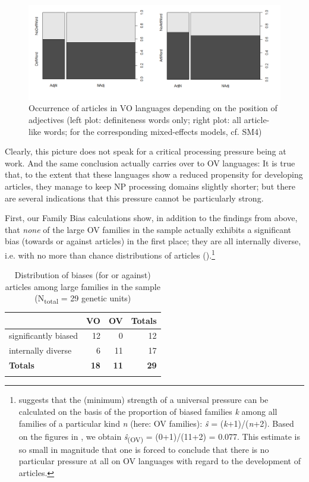 \documentclass[output=paper]{langsci/langscibook}
\begin{document}
  

\begin{figure}
\includegraphics[width=\textwidth]{figures/schmidtkebode-img4.png}
\caption{Occurrence of articles in VO languages depending on the position of adjectives (left plot: definiteness words only; right plot: all article-like words; for the corresponding mixed-effects models, cf. SM4)}
\label{fig:ksb:4}
\end{figure}

Clearly, this picture does not speak for a critical processing pressure being at work. And the same conclusion actually carries over to OV languages: It is true that, to the extent that these languages show a reduced propensity for developing articles, they manage to keep NP processing domains slightly shorter; but there are several indications that this pressure cannot be particularly strong. 

First, our Family Bias calculations show, in addition to the findings from above, that \textit{none} of the large OV families in the sample actually exhibits a significant bias (towards or against articles) in the first place; they are all internally diverse, i.e. with no more than chance distributions of articles ().\footnote{\citet{Bickel2013} suggests that the (minimum) strength of a universal pressure can be calculated on the basis of the proportion of biased families \textit{k} among all families of a particular kind \textit{n} (here: OV families): \textit{\^s}\textsubscript{} =\textsubscript{} (\textit{k}+1)/(\textit{n}+2). Based on the figures in , we obtain \textit{\^s}\textsubscript{(OV)} = (0+1)/(11+2) = 0.077. This estimate is so small in magnitude that one is forced to conclude that there is no particular pressure at all on OV languages with regard to the development of articles.} 

\begin{table}
\begin{tabularx}{.8\textwidth}{Xrrr}
\lsptoprule
& VO & OV &  Totals\\
\midrule
significantly biased & 12 & 0 & 12\\
internally diverse & 6 & 11 & 17\\
\midrule
\textbf{Totals} & \textbf{18} & \textbf{11} & \textbf{29}\\
\lspbottomrule
\end{tabularx}
\caption{Distribution of biases (for or against) articles among large families in the sample (N\textsubscript{total} = 29 genetic units)}
\label{tab:ksb:4}
\end{table}
\end{document}
